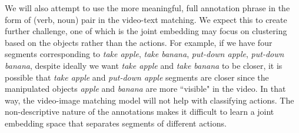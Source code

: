 We will also attempt to use the more meaningful, full annotation phrase in the form of (verb, noun) pair in the video-text matching. We expect this to create further challenge, one of which is the joint embedding may focus on clustering based on the objects rather than the actions. For example, if we have four segments corresponding to \textit{take apple}, \textit{take banana}, \textit{put-down apple}, \textit{put-down banana}, despite ideally we want \textit{take apple} and \textit{take banana} to be closer, it is possible that \textit{take apple} and \textit{put-down apple} segments are closer since the manipulated objects \textit{apple} and \textit{banana} are more ``visible" in the video. In that way, the video-image matching model will not help with classifying actions. The non-descriptive nature of the annotations makes it difficult to learn a joint embedding space that separates segments of different actions.